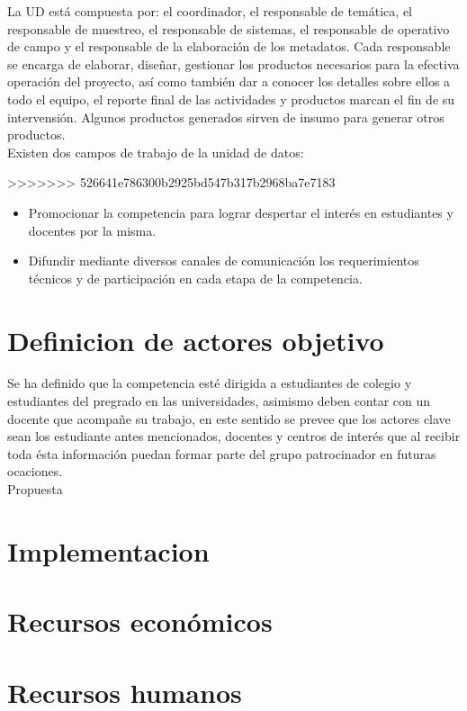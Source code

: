 \documentclass{article}
\begin{document}
La UD está compuesta por: el coordinador, el responsable de temática, el responsable de muestreo, el responsable de sistemas, el responsable de operativo de campo y el responsable de la elaboración de los metadatos. Cada responsable se encarga de elaborar, diseñar, gestionar los productos necesarios para la efectiva operación del proyecto,  así como también dar a conocer los detalles sobre ellos a todo el equipo, el reporte final de las actividades y productos  marcan el fin de su intervensión. Algunos productos generados  sirven de insumo para generar otros productos.\\

Existen dos campos de trabajo de la unidad de datos:

>>>>>>> 526641e786300b2925bd547b317b2968ba7e7183
\begin{itemize}
\item	Promocionar la competencia para lograr despertar el interés en estudiantes y docentes por la misma. 

\item	Difundir mediante diversos canales de comunicación los requerimientos técnicos y de participación en cada etapa de la competencia.
\end{itemize} 

\section{Definicion de actores objetivo}


Se ha definido que la competencia esté dirigida a estudiantes de colegio y estudiantes del pregrado en las universidades, asimismo deben contar con un docente que acompañe su trabajo, en este sentido se prevee que los actores clave sean los estudiante antes mencionados, docentes y centros de interés que al recibir toda ésta información puedan formar parte del grupo patrocinador en futuras ocaciones. \\

Propuesta

\section{Implementacion}


\section{Recursos económicos}

\section{Recursos humanos}
\end{document}

